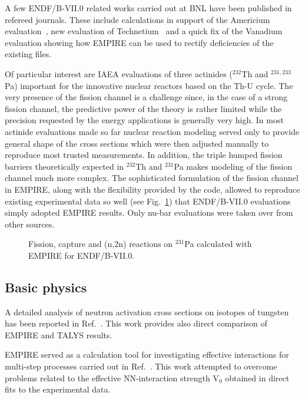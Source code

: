 A few ENDF/B-VII.0 related works carried out at BNL have been published in
refereed journals. These include calculations in support of the Americium
evaluation~\cite{Rochman:06a}, new evaluation of Technetium~\cite%
{Rochman:07c} and a quick fix of the Vanadium~\cite{Rochman:06b} evaluation
showing how EMPIRE can be used to rectify deficiencies of the existing files.

Of particular interest are IAEA evaluations of three actinides ($^{232}$Th
and $^{231,233}$Pa) important for the innovative nuclear reactors based on
the Th-U cycle. The very presence of the fission channel is a challenge
since, in the case of a strong fission channel, the predictive power of the
theory is rather limited while the precision requested by the energy
applications is generally very high. In most actinide evaluations made so
far nuclear reaction modeling served only to provide general shape of the
cross sections which were then adjusted manually to reproduce most trusted
measurements. In addition, the triple humped fission barriers theoretically
expected in $^{232}$Th and $^{231}$Pa makes modeling of the fission channel
much more complex. The sophisticated formulation of the fission channel in
EMPIRE, along with the flexibility provided by the code, allowed to
reproduce existing experimental data so well (see Fig.~\ref{231Pr}) that
ENDF/B-VII.0 evaluations simply adopted EMPIRE results. Only nu-bar
evaluations were taken over from other sources.

\begin{figure}[tbph]
\caption{Fission, capture and (n,2n) reactions on $^{231}$Pa calculated with
EMPIRE for ENDF/B-VII.0.}
\label{231Pr}
\end{figure}

\subsection{Basic physics}

A detailed analysis of neutron activation cross sections on isotopes of
tungsten has been reported in Ref.~\cite{Avrigeanu:06}. This work provides
also direct comparison of EMPIRE and TALYS results.

EMPIRE served as a calculation tool for investigating effective interactions
for multi-step processes carried out in Ref.~\cite{avrigeanu2001eim}. This
work attempted to overcome problems related to the effective NN-interaction
strength V$_0$ obtained in direct fits to the experimental data.

